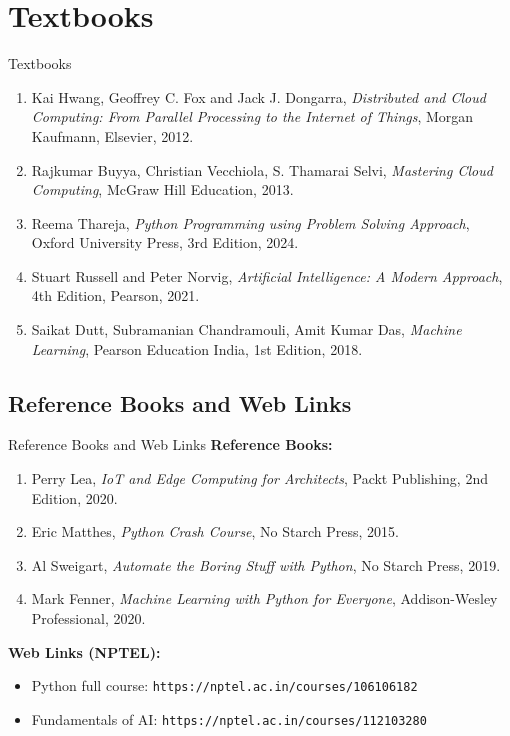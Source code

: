 \documentclass[aspectratio=169]{beamer}
\begin{document}
\section{Textbooks}
\begin{frame}{Textbooks}
\small
\begin{enumerate}
\item Kai Hwang, Geoffrey C. Fox and Jack J. Dongarra, \textit{Distributed and Cloud Computing: From Parallel Processing to the Internet of Things}, Morgan Kaufmann, Elsevier, 2012.
\item Rajkumar Buyya, Christian Vecchiola, S. Thamarai Selvi, \textit{Mastering Cloud Computing}, McGraw Hill Education, 2013.
\item Reema Thareja, \textit{Python Programming using Problem Solving Approach}, Oxford University Press, 3rd Edition, 2024.
\item Stuart Russell and Peter Norvig, \textit{Artificial Intelligence: A Modern Approach}, 4th Edition, Pearson, 2021.
\item Saikat Dutt, Subramanian Chandramouli, Amit Kumar Das, \textit{Machine Learning}, Pearson Education India, 1st Edition, 2018.
\end{enumerate}
\end{frame}

\subsection{Reference Books and Web Links}
\begin{frame}{Reference Books and Web Links}
\small
\textbf{Reference Books:}
\begin{enumerate}
\item Perry Lea, \textit{IoT and Edge Computing for Architects}, Packt Publishing, 2nd Edition, 2020.
\item Eric Matthes, \textit{Python Crash Course}, No Starch Press, 2015.
\item Al Sweigart, \textit{Automate the Boring Stuff with Python}, No Starch Press, 2019.
\item Mark Fenner, \textit{Machine Learning with Python for Everyone}, Addison-Wesley Professional, 2020.
\end{enumerate}
\vspace{0.2cm}
\textbf{Web Links (NPTEL):}
\begin{itemize}
\item Python full course: \texttt{https://nptel.ac.in/courses/106106182}
\item Fundamentals of AI: \texttt{https://nptel.ac.in/courses/112103280}
\end{itemize}
\end{frame}
\end{document}
